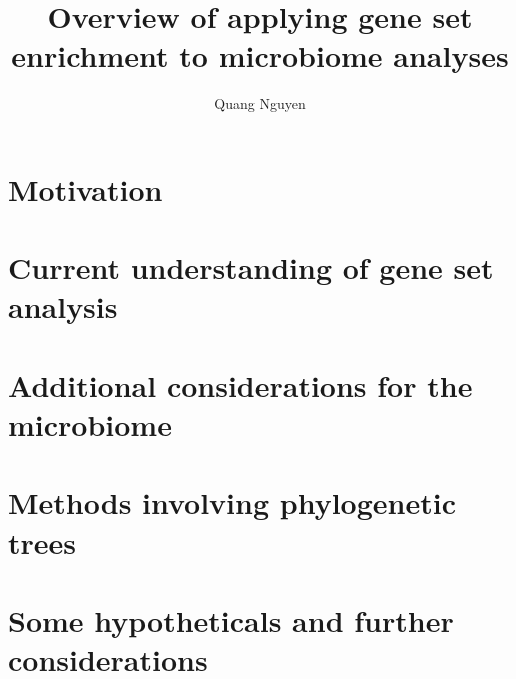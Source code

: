 \documentclass{article}
\title{Overview of applying gene set enrichment to microbiome analyses}
\author{Quang Nguyen}
\begin{document}
\maketitle

\section{Motivation}
\section{Current understanding of gene set analysis}
\section{Additional considerations for the microbiome}
\section{Methods involving phylogenetic trees}
\section{Some hypotheticals and further considerations}
\end{document}
